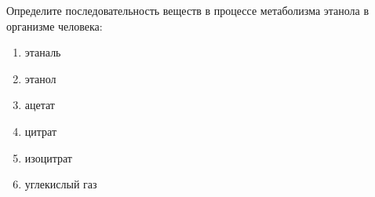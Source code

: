 Определите последовательность веществ в процессе метаболизма этанола в организме человека:\\

\begin{enumerate}
    \item этаналь
    \item этанол
    \item ацетат
    \item цитрат
    \item изоцитрат
    \item углекислый газ
\end{enumerate}

